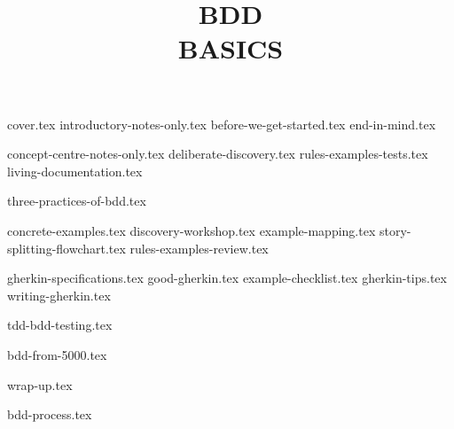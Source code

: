 \documentclass[a4paper,12pt]{report}
\title{BDD\\BASICS}
\begin{document}
{cover.tex}
{introductory-notes-only.tex}
{before-we-get-started.tex}
{end-in-mind.tex}

{concept-centre-notes-only.tex}
{deliberate-discovery.tex}
{rules-examples-tests.tex}
{living-documentation.tex}

{three-practices-of-bdd.tex}



{concrete-examples.tex}
{discovery-workshop.tex} 
{example-mapping.tex} 
{story-splitting-flowchart.tex}
{rules-examples-review.tex} 

{gherkin-specifications.tex}
{good-gherkin.tex}
{example-checklist.tex}
{gherkin-tips.tex}
{writing-gherkin.tex}

{tdd-bdd-testing.tex}

{bdd-from-5000.tex}


{wrap-up.tex}


{bdd-process.tex}
\end{document}
